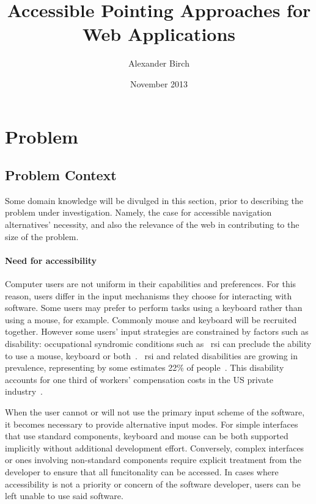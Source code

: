 \documentclass[a4paper, 11pt]{article}
\title{Accessible Pointing Approaches for Web Applications}
\author{Alexander Birch}
\date{November 2013}
\begin{document}

\maketitle
\tableofcontents
\pagebreak

\section{Problem}
\subsection{Problem Context}
Some domain knowledge will be divulged in this section, prior to describing the problem under investigation. Namely, the case for accessible navigation alternatives' necessity, and also the relevance of the web in contributing to the size of the problem.
\paragraph{Need for accessibility}
Computer users are not uniform in their capabilities and preferences. For this reason, users differ in the input mechanisms they choose for interacting with software. Some users may prefer to perform tasks using a keyboard rather than using a mouse, for example. Commonly mouse and keyboard will be recruited together. However some users' input strategies are constrained by factors such as disability: occupational syndromic conditions such as ~\gls{rsi} can preclude the ability to use a mouse, keyboard or both~\cite{trewin1999keyboard}. ~\gls{rsi} and related disabilities are growing in prevalence, representing by some estimates 22\% of people~\cite{rsiprevalence}. This disability accounts for one third of workers' compensation costs in the US private industry~\cite{barr2002pathophysiological}.

When the user cannot or will not use the primary input scheme of the software, it becomes necessary to provide alternative input modes. For simple interfaces that use standard components, keyboard and mouse can be both supported implicitly without additional development effort. Conversely, complex interfaces or ones involving non-standard components require explicit treatment from the developer to ensure that all funcitonality can be accessed. In cases where accessibility is not a priority or concern of the software developer, users can be left unable to use said software.
\end{document}
